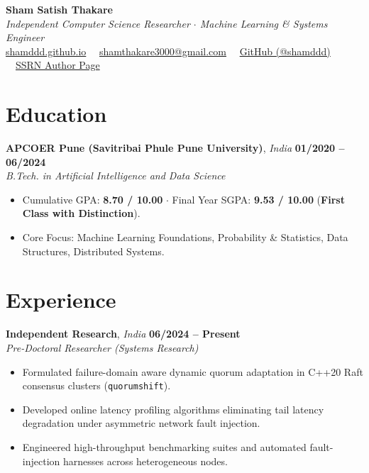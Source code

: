 \documentclass[10pt,letterpaper]{article}
\begin{document}
\pagestyle{empty}

\begin{center}
    {\huge \bfseries Sham Satish Thakare} \\[3pt]
    {\large \itshape Independent Computer Science Researcher $\cdot$ Machine Learning \& Systems Engineer} \\[4pt]
    \href{https://shamddd.github.io/shamthakare.github.io}{shamddd.github.io} \ \textperiodcentered \ \href{mailto:shamthakare3000@gmail.com}{shamthakare3000@gmail.com} \ \textperiodcentered \ \href{https://github.com/shamddd}{GitHub (@shamddd)} \ \textperiodcentered \ \href{https://ssrn.com/author=13130226}{SSRN Author Page}
\end{center}

\vspace{-4pt}

\section*{Education}
\textbf{APCOER Pune (Savitribai Phule Pune University)}, \textit{India} \hfill \textbf{01/2020 -- 06/2024} \\
\textit{B.Tech. in Artificial Intelligence and Data Science}
\begin{itemize}
    \item Cumulative GPA: \textbf{8.70 / 10.00} $\cdot$ Final Year SGPA: \textbf{9.53 / 10.00} (\textbf{First Class with Distinction}).
    \item Core Focus: Machine Learning Foundations, Probability \& Statistics, Data Structures, Distributed Systems.
\end{itemize}

\vspace{3pt}

\section*{Experience}
\textbf{Independent Research}, \textit{India} \hfill \textbf{06/2024 -- Present} \\
\textit{Pre-Doctoral Researcher (Systems Research)} \\
\begin{itemize}
    \item Formulated failure-domain aware dynamic quorum adaptation in C++20 Raft consensus clusters (\texttt{quorumshift}).
    \item Developed online latency profiling algorithms eliminating tail latency degradation under asymmetric network fault injection.
    \item Engineered high-throughput benchmarking suites and automated fault-injection harnesses across heterogeneous nodes.
\end{itemize}
\end{document}
